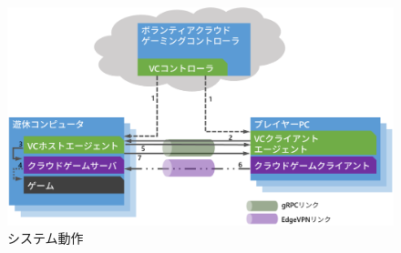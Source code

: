 \begin{figure}[t]
    \centering
    \includegraphics[width=\textwidth,keepaspectratio,clip]{img/sequence.eps}
    \caption{システム動作}
    \label{fig:seq}
\end{figure}

